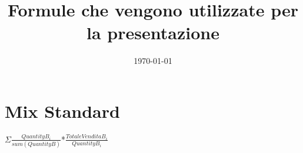 \documentclass[20pt]{extarticle}
\title{Formule che vengono utilizzate per la presentazione}
\date{\today}
\begin{document}
\maketitle
\section{Mix Standard}
$\Sigma$$\frac{Quantity B_{i}}{sum(Quantity B)}$*$\frac{Totale Vendita B_{i}}{Quantity B_{i}}$
 
\end{document}

